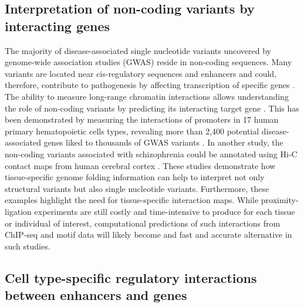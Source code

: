 \documentclass[a4paper,twoside=true,openright,parskip=full,chapterprefix=true,11pt,headings=normal,bibliography=totoc,listof=totoc,titlepage=on,captions=tableabove,draft=false]{scrreprt}
\theoremstyle{definition}
\theoremstyle{definition}
\theoremstyle{definition}
\theoremstyle{remark}
\begin{document}
\hypertarget{interpretation-of-non-coding-variants-by-interacting-genes}{%
\subsection{Interpretation of non-coding variants by interacting
genes}\label{interpretation-of-non-coding-variants-by-interacting-genes}}

The majority of disease-associated single nucleotide variants uncovered
by genome-wide association studies (GWAS) reside in non-coding
sequences. Many variants are located near cis-regulatory sequences and
enhancers and could, therefore, contribute to pathogenesis by affecting
transcription of specific genes \citep{Hindorff2009}. The ability to
measure long-range chromatin interactions allows understanding the role
of non-coding variants by predicting its interacting target gene
\citep{Smemo2014, Visser2012}. This has been demonstrated by measuring
the interactions of promoters in 17 human primary hematopoietic cells
types, revealing more than 2,400 potential disease-associated genes
liked to thousands of GWAS variants \citep{Javierre2016}. In another
study, the non-coding variants associated with schizophrenia could be
annotated using Hi-C contact maps from human cerebral cortex
\citep{Won2016}. These studies demonstrate how tissue-specific genome
folding information can help to interpret not only structural variants
but also single nucleotide variants. Furthermore, these examples
highlight the need for tissue-specific interaction maps. While
proximity-ligation experiments are still costly and time-intensive to
produce for each tissue or individual of interest, computational
predictions of such interactions from ChIP-seq and motif data will
likely become and fast and accurate alternative in such studies.

\hypertarget{cell-type-specific-regulatory-interactions-between-enhancers-and-genes}{%
\subsection{Cell type-specific regulatory interactions between enhancers
and
genes}\label{cell-type-specific-regulatory-interactions-between-enhancers-and-genes}}
\end{document}
